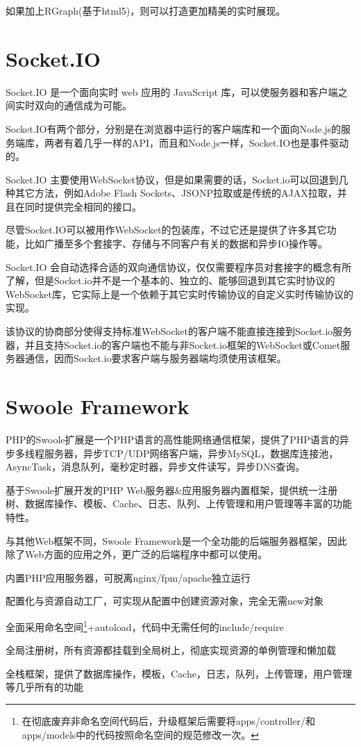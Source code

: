 如果加上RGraph(基于html5)，则可以打造更加精美的实时展现。

\section{Socket.IO}


Socket.IO 是一个面向实时 web 应用的 JavaScript 库，可以使服务器和客户端之间实时双向的通信成为可能。

Socket.IO有两个部分，分别是在浏览器中运行的客户端库和一个面向Node.js的服务端库，两者有着几乎一样的API，而且和Node.js一样，Socket.IO也是事件驱动的。

Socket.IO 主要使用WebSocket协议，但是如果需要的话，Socket.io可以回退到几种其它方法，例如Adobe Flash Sockets、JSONP拉取或是传统的AJAX拉取，并且在同时提供完全相同的接口。

尽管Socket.IO可以被用作WebSocket的包装库，不过它还是提供了许多其它功能，比如广播至多个套接字、存储与不同客户有关的数据和异步IO操作等。

Socket.IO 会自动选择合适的双向通信协议，仅仅需要程序员对套接字的概念有所了解，但是Socket.io并不是一个基本的、独立的、能够回退到其它实时协议的WebSocket库，它实际上是一个依赖于其它实时传输协议的自定义实时传输协议的实现。


该协议的协商部分使得支持标准WebSocket的客户端不能直接连接到Socket.io服务器，并且支持Socket.io的客户端也不能与非Socket.io框架的WebSocket或Comet服务器通信，因而Socket.io要求客户端与服务器端均须使用该框架。


\section{Swoole Framework}


PHP的Swoole扩展是一个PHP语言的高性能网络通信框架，提供了PHP语言的异步多线程服务器，异步TCP/UDP网络客户端，异步MySQL，数据库连接池，AsyncTask，消息队列，毫秒定时器，异步文件读写，异步DNS查询。

基于Swoole扩展开发的PHP Web服务器\&应用服务器内置框架，提供统一注册树、数据库操作、模板、Cache、日志、队列、上传管理和用户管理等丰富的功能特性。

与其他Web框架不同，Swoole Framework是一个全功能的后端服务器框架，因此除了Web方面的应用之外，更广泛的后端程序中都可以使用。

\begin{compactitem}
\item 内置PHP应用服务器，可脱离nginx/fpm/apache独立运行
\item 配置化与资源自动工厂，可实现从配置中创建资源对象，完全无需new对象
\item 全面采用命名空间\footnote{在彻底废弃非命名空间代码后，升级框架后需要将apps/controller/和apps/models中的代码按照命名空间的规范修改一次。}+autoload，代码中无需任何的include/require
\item 全局注册树，所有资源都挂载到全局树上，彻底实现资源的单例管理和懒加载
\item 全栈框架，提供了数据库操作，模板，Cache，日志，队列，上传管理，用户管理等几乎所有的功能
\end{compactitem}

